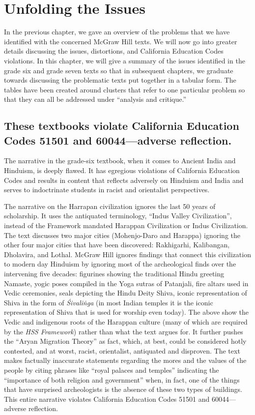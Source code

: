 \chapter{Unfolding the Issues}

In the previous chapter, we gave an overview of the problems that we have identified with the concerned McGraw Hill texts. We will now go into greater details discussing the issues, distortions, and California Education Codes violations. In this chapter, we will give a summary of the issues identified in the grade six and grade seven texts so that in subsequent chapters, we graduate towards discussing the problematic texts put together in a tabular form. The tables have been created around clusters that refer to one particular problem so that they can all be addressed under “analysis and critique.”  
\vskip -10pt

\section*{These textbooks violate California Education Codes 51501 and 60044—adverse reflection.} 
\vskip -6pt

The narrative in the grade-six textbook, when it comes to Ancient India and Hinduism, is deeply flawed. It has egregious violations of California Education Codes and results in content that reflects adversely on Hinduism and India and serves to indoctrinate students in racist and orientalist perspectives.

The narrative on the Harrapan civilization ignores the last 50 years of scholarship. It uses the antiquated terminology, “Indus Valley Civilization”, instead of the Framework mandated Harappan Civilization or Indus Civilization. The text discusses two major cities (Mohenjo-Daro and Harappa) ignoring the other four major cities that have been discovered: Rakhigarhi, Kalibangan, Dholavira, and Lothal. McGraw Hill ignores findings that connect this civilization to modern day Hinduism by ignoring most of the archeological finds over the intervening five decades: figurines showing the traditional Hindu greeting Namaste, yogic poses compiled in the Yoga sutras of Patanjali, fire altars used in Vedic ceremonies, seals depicting the Hindu Deity Shiva, iconic representation of Shiva in the form of \textit{Śivaliṅga}  (in most Indian temples it is the iconic representation of Shiva that is used for worship even today). The above show the Vedic and indigenous roots of the Harappan culture (many of which are required by the \textit{HSS Framework}) rather than what the text argues for. It further pushes the “Aryan Migration Theory” as fact, which, at best, could be considered hotly contested, and at worst, racist, orientalist, antiquated and disproven. The text makes factually inaccurate statements regarding the mores and the values of the people by citing phrases like “royal palaces and temples” indicating the “importance of both religion and government” when, in fact, one of the things that have surprised archeologists is the absence of these two types of buildings. This entire narrative violates California Education Codes 51501 and 60044—adverse reflection.  

